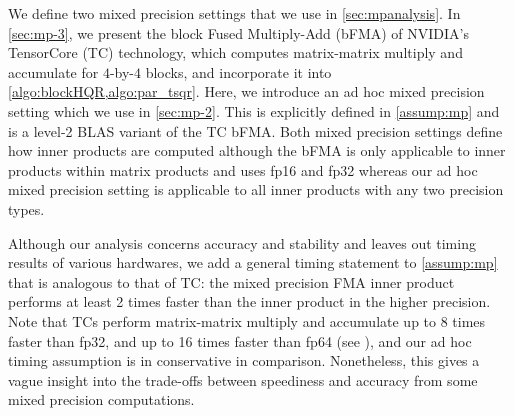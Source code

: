 We define two mixed precision settings that we use in \cref{sec:mpanalysis}.
In \cref{sec:mp-3}, we present the block Fused Multiply-Add (bFMA) of NVIDIA's TensorCore (TC) technology, which computes matrix-matrix multiply and accumulate for $4$-by-$4$ blocks, and incorporate it into \cref{algo:blockHQR,algo:par_tsqr}.
Here, we introduce an ad hoc mixed precision setting which we use in \cref{sec:mp-2}.
This is explicitly defined in \cref{assump:mp} and is a level-2 BLAS variant of the TC bFMA. 
Both mixed precision settings define how inner products are computed although the bFMA is only applicable to inner products within matrix products and uses fp16 and fp32 whereas our 
ad hoc mixed precision setting is applicable to all inner products with any two precision types.\par  

Although our analysis concerns accuracy and stability and leaves out timing results of various hardwares, we add a general timing statement to \cref{assump:mp} that is analogous to that of TC: the mixed precision FMA inner product performs at least 2 times faster than the inner product in the higher precision.
Note that TCs perform matrix-matrix multiply and accumulate up to 8 times faster than fp32, and up to 16 times faster than fp64 (see ), and our ad hoc timing assumption is in conservative in comparison. 
Nonetheless, this gives a vague insight into the trade-offs between speediness and accuracy from some mixed precision computations.  

